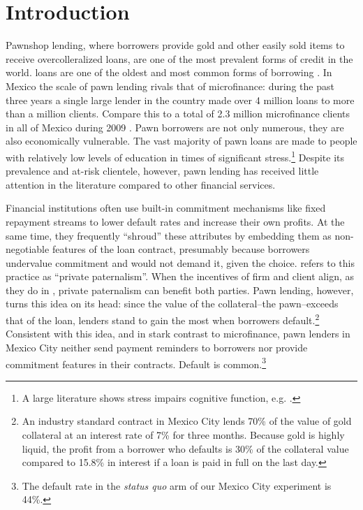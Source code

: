 \documentclass[12pt, a4paper]{article}
\begin{document}

\newpage

\section{Introduction}


Pawnshop lending, where borrowers provide gold and other easily sold items to receive overcolleralized loans, are one of the most prevalent forms of credit in the world. loans are one of the oldest and most common forms of borrowing \citep{carter2012pawnshops}. 
In Mexico the scale of pawn lending rivals that of microfinance: during the past three years a single large lender in the country made over 4 million loans to more than a million clients. Compare this to a total of 2.3 million microfinance clients in all of Mexico during 2009 \citep{Pedroza:2010}. Pawn borrowers are not only numerous, they are also economically vulnerable. The vast majority of pawn loans are made to people with relatively low levels of education in times of significant stress.\footnote{A large literature shows stress impairs cognitive function, e.g. \cite{StressReview}.} Despite its prevalence and at-risk clientele, however, pawn lending has received little attention in the literature compared to other financial services. 

Financial institutions often use built-in commitment mechanisms like fixed repayment streams to lower default rates and increase their own profits. At the same time, they frequently ``shroud'' these attributes by embedding them as non-negotiable features of the loan contract, presumably because borrowers undervalue commitment and would not demand it, given the choice. \cite{Laibson2018} refers to this practice as ``private paternalism''. When the incentives of firm and client align, as they do in \cite{Laibson2018}, private paternalism can benefit both parties. Pawn lending, however, turns this idea on its head: since the value of the collateral--the pawn--exceeds that of the loan, lenders stand to gain the most when borrowers default.\footnote{An industry standard contract in Mexico City lends 70\% of the value of gold collateral at an interest rate of 7\% for three months. Because gold is highly liquid, the profit from a borrower who defaults is 30\% of the collateral value compared to 15.8\% in interest if a loan is paid in full on the last day.}
Consistent with this idea, and in stark contrast to microfinance, pawn lenders in Mexico City neither send payment reminders to borrowers nor provide commitment features in their contracts. Default is common.\footnote{The default rate in the \emph{status quo} arm of our Mexico City experiment is 44\%.} 
\end{document}
